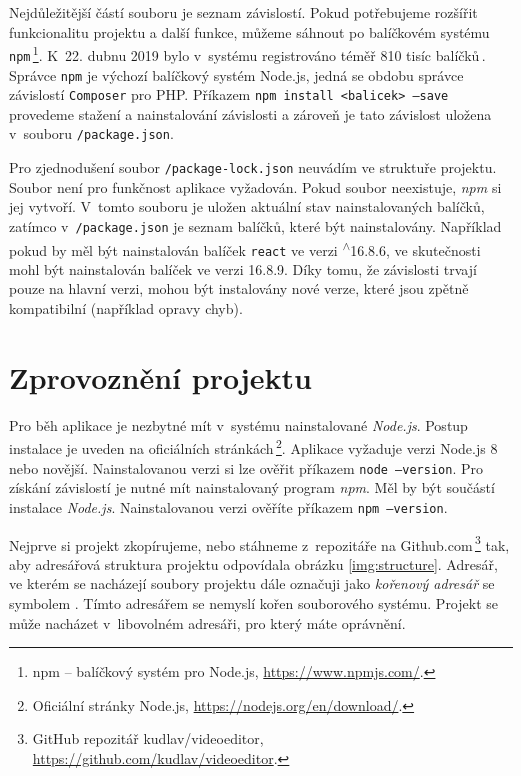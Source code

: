 Nejdůležitější částí souboru je seznam závislostí. Pokud potřebujeme rozšířit funkcionalitu projektu a další funkce, můžeme sáhnout po balíčkovém systému \texttt{npm}\,\footnote{npm -- balíčkový systém pro Node.js, \url{https://www.npmjs.com/}.}. K~22. dubnu 2019 bylo v~systému registrováno téměř 810 tisíc balíčků\,\cite{modulecounts}. Správce \texttt{npm} je výchozí balíčkový systém Node.js, jedná se obdobu správce závislostí \texttt{Composer} pro PHP. Příkazem \texttt{npm install <balicek> --save} provedeme stažení a nainstalování závislosti a zároveň je tato závislost uložena v~souboru \texttt{/package.json}.

Pro zjednodušení soubor \texttt{/package-lock.json} neuvádím ve struktuře projektu. Soubor není pro funkčnost aplikace vyžadován. Pokud soubor neexistuje, \textit{npm} si jej vytvoří. V~tomto souboru je uložen aktuální stav nainstalovaných balíčků, zatímco v~\texttt{/package.json} je seznam balíčků, které  být nainstalovány. Například pokud by měl být nainstalován balíček \texttt{react} ve verzi \textsuperscript{$\wedge$}16.8.6, ve skutečnosti mohl být nainstalován balíček ve verzi 16.8.9. Díky tomu, že závislosti trvají pouze na hlavní verzi, mohou být instalovány nové verze, které jsou zpětně kompatibilní (například opravy chyb).

\section{Zprovoznění projektu}
Pro běh aplikace je nezbytné mít v~systému nainstalované \textit{Node.js}. Postup instalace je uveden na oficiálních stránkách\,\footnote{Oficiální stránky Node.js, \url{https://nodejs.org/en/download/}.}. Aplikace vyžaduje verzi Node.js 8 nebo novější. Nainstalovanou verzi si lze ověřit příkazem \texttt{node --version}. Pro získání závislostí je nutné mít nainstalovaný program \textit{npm}. Měl by být součástí instalace \textit{Node.js}. Nainstalovanou verzi ověříte příkazem \texttt{npm --version}.

Nejprve si projekt zkopírujeme, nebo stáhneme z~repozitáře na Github.com\,\footnote{GitHub repozitář kudlav/videoeditor, \url{https://github.com/kudlav/videoeditor}.} tak, aby adresářová struktura projektu odpovídala obrázku \ref{img:structure}. Adresář, ve kterém se nacházejí soubory projektu dále označuji jako \textit{kořenový adresář} se symbolem \uv{/}. Tímto adresářem se nemyslí kořen souborového systému. Projekt se může nacházet v~libovolném adresáři, pro který máte oprávnění.

